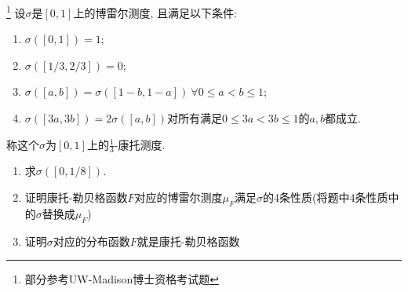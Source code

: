 \begin{example}\label{Cantor_measure}\footnote{部分参考UW-Madison博士资格考试题}
    设$\sigma$是$[0,1]$上的博雷尔测度, 且满足以下条件:
    \begin{enumerate}
    \item $\sigma([0,1]) = 1$;
    \item $\sigma([1/3, 2/3]) = 0$;
    \item $\sigma([a,b]) = \sigma([1-b,1-a])~\forall 0 \leq a < b \leq 1$;
    \item $\sigma([3a, 3b]) = 2\sigma([a,b])$对所有满足$0 \leq 3a < 3b \leq 1$的$a,b$都成立. 
    \end{enumerate}
    称这个$\sigma$为$[0,1]$上的$\frac{1}{3}$-康托测度. 
    \begin{enumerate}
        \item 求$\sigma([0, 1/8])$.
        \item 证明康托-勒贝格函数$F$对应的博雷尔测度$\mu_F$满足$\sigma$的4条性质(将题中4条性质中的$\sigma$替换成$\mu_F$)
        \item 证明$\sigma$对应的分布函数$F$就是康托-勒贝格函数
    \end{enumerate}
\end{example}
